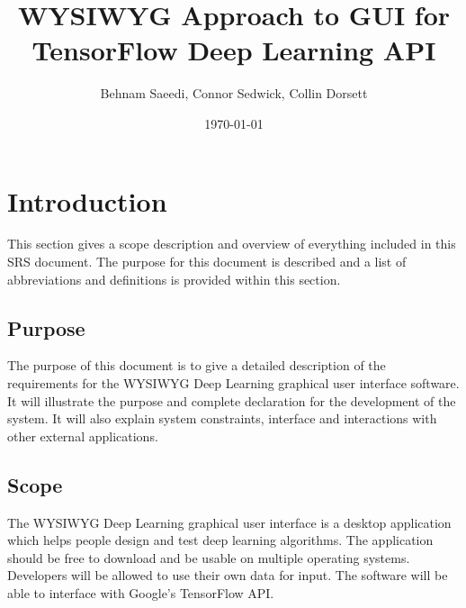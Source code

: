 \documentclass[journal,10pt,onecolumn,compsoc]{IEEEtran} \usepackage[margin=1.0in]{geometry} \usepackage{pdfpages} \usepackage{graphicx}
\title{WYSIWYG Approach to GUI for TensorFlow Deep Learning API}
\author{Behnam Saeedi, Connor Sedwick, Collin Dorsett}
\date{\today}
\begin{document}
\maketitle
\newpage
\tableofcontents
\newpage
\section{Introduction}

This section gives a scope description and overview of everything included in this SRS document. 
The purpose for this document is described and a list of abbreviations and definitions is provided within this section.

\subsection{Purpose}

The purpose of this document is to give a detailed description of the requirements for the WYSIWYG Deep Learning graphical user interface software. It will illustrate the purpose and complete declaration for the development of the system. It will also explain system constraints, interface and interactions with other external applications. 

\subsection{Scope}

The WYSIWYG Deep Learning graphical user interface is a desktop application which helps people design and test deep learning algorithms.
The application should be free to download and be usable on multiple operating systems.
Developers will be allowed to use their own data for input.
The software will be able to interface with Google's TensorFlow API. 
\end{document}
